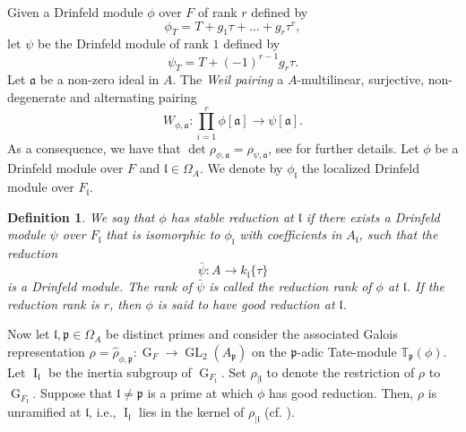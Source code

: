 \documentclass[11pt]{amsart}
\newtheorem{definition}[theorem]{Definition}
\newcommand{\fl}{\mathfrak{l}}
\newcommand{\op}[1]{\operatorname{#1}}
\numberwithin{equation}{section}
\begin{document}
\par Given a Drinfeld module $\phi$ over $F$ of rank $r$ defined by \[\phi_T= T+g_1 \tau+\dots+ g_r \tau^r,\]
let $\psi$ be the Drinfeld module of rank $1$ defined by 
\[\psi_T=T+(-1)^{r-1}g_r \tau.\]
Let $\mathfrak{a}$ be a non-zero ideal in $A$. The \emph{Weil pairing} a $A$-multilinear, surjective, non-degenerate and alternating pairing 
\[W_{\phi, \mathfrak{a}}: \prod_{i=1}^r \phi[\mathfrak{a}]\rightarrow \psi[\mathfrak{a}]. \]
As a consequence, we have that $\op{det}\rho_{\phi, \mathfrak{a}}=\rho_{\psi, \mathfrak{a}}$, see \cite[Theorem 3.7.1]{papibook} for further details. Let $\phi$ be a Drinfeld module over $F$ and $\mathfrak{l} \in \Omega_A$. We denote by $\phi_{\mathfrak{l}}$ the localized Drinfeld module over $F_{\mathfrak{l}}$.
\begin{definition}
    We say that $\phi$ has \emph{stable reduction} at $\mathfrak{l}$ if there exists a Drinfeld module $\psi$ over $F_\mathfrak{l}$ that is isomorphic to $\phi_\mathfrak{l}$ with coefficients in $A_\mathfrak{l}$, such that the reduction
\[
\bar{\psi}: A \rightarrow k_\mathfrak{l}\{\tau\}
\]
is a Drinfeld module. The rank of $\bar{\psi}$ is called the \emph{reduction rank} of $\phi$ at $\mathfrak{l}$. If the reduction rank is $r$, then $\phi$ is said to have \emph{good reduction} at $\mathfrak{l}$.
\end{definition}
Now let $\fl, \mathfrak{p}\in \Omega_A$ be distinct primes and consider the associated Galois representation $\rho=\hat{\rho}_{\phi, \mathfrak{p}}: \op{G}_F\rightarrow \op{GL}_2(A_{ \mathfrak{p}})$ on the $\mathfrak{p}$-adic Tate-module $\mathbb{T}_{\mathfrak{p}}(\phi)$. Let $\op{I}_{\mathfrak{l}}$ be the inertia subgroup of $\op{G}_{F_{\mathfrak{l}}}$. Set $\rho_{|\mathfrak{l}}$ to denote the restriction of $\rho$ to $\op{G}_{F_{\mathfrak{l}}}$. Suppose that $\mathfrak{l}\neq \mathfrak{p}$ is a prime at which $\phi$ has good reduction. Then, $\rho$ is unramified at $\mathfrak{l}$, i.e., $\op{I}_{\mathfrak{l}}$ lies in the kernel of $\rho_{|\mathfrak{l}}$ (cf. \cite[section 6.1]{papibook}). 
\end{document}
